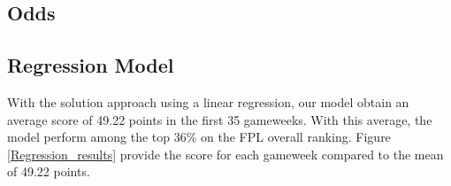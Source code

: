 \newpage
\subsection{Odds}

\newpage
\subsection{Regression Model}
With the solution approach using a linear regression, our model obtain an average score of 49.22 points in the first 35 gameweeks. With this average, the model perform among the top 36\% on the FPL overall ranking. Figure \ref{Regression_results} provide the score for each gameweek compared to the mean of 49.22 points. 


